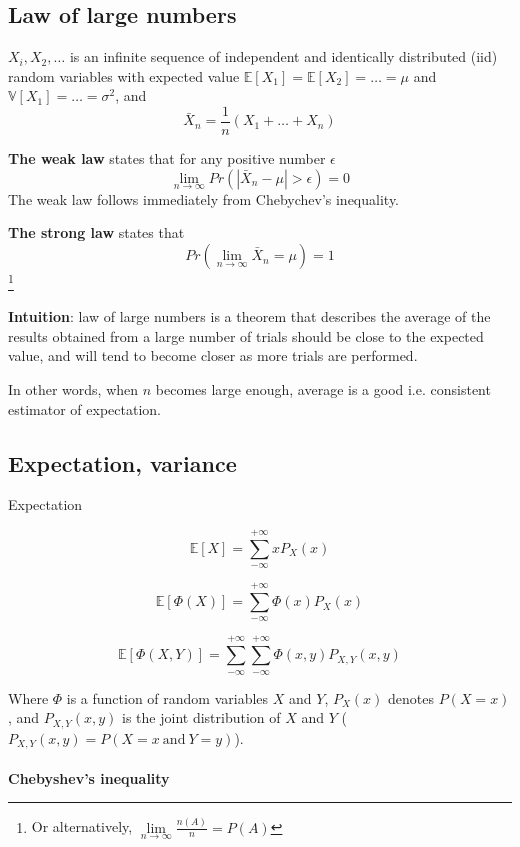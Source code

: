 \documentclass{article}
\newcommand*\mean[1]{\bar{#1}}
\begin{document}
\subsection{Law of large numbers}
\label{law-of-large-numbers}

$X_i, X_2, \dots$ is an infinite sequence of independent and identically distributed (iid) random variables with expected value $\mathbb{E}[X_1] = \mathbb{E}[X_2] = \dots = \mu$ and $\mathbb{V}[X_1] = \dots = \sigma^2$, and
$$
\mean{X}_n = \frac{1}{n}(X_1 + \dots + X_n)
$$

\textbf{The weak law} states that for any positive number $\epsilon$
$$
\lim\limits_{n \to \infty}{Pr(|\mean{X}_n - \mu| > \epsilon)} = 0
$$
The weak law follows immediately from Chebychev's inequality.

\textbf{The strong law} states that
$$
Pr(\lim\limits_{n \to \infty}{\mean{X}_n = \mu}) = 1
$$
\footnote{Or alternatively, $\lim\limits_{n \to \infty}{\frac{n(A)}{n}} = P(A)$}

\textbf{Intuition}: law of large numbers is a theorem that describes the average of the results obtained from a large number of trials should be close to the expected value, and will tend to become closer as more trials are performed.

In other words, when $n$ becomes large enough, average is a good i.e. consistent estimator of expectation.


\subsection{Expectation, variance}

Expectation

$$
\mathbb{E}[X] = \sum_{-\infty}^{+\infty}{ x P_{X}(x)}
$$

$$
\mathbb{E}[\Phi(X)] = \sum_{-\infty}^{+\infty}{ \Phi(x) P_{X}(x)}
$$

$$
\mathbb{E}[\Phi(X, Y)] = \sum_{-\infty}^{+\infty}{ \sum_{-\infty}^{+\infty}{ \Phi(x, y) } P_{X, Y}(x, y)}
$$

Where $\Phi$ is a function of random variables $X$ and $Y$, $P_{X}(x)$ denotes $P(X = x)$, and $P_{X, Y}(x, y)$ is the joint distribution of $X$ and $Y$ ($P_{X, Y}(x, y) = P(X = x ~\text{and}~ Y = y)$).
\\
\\
\textbf{Chebyshev's inequality}

\end{document}
